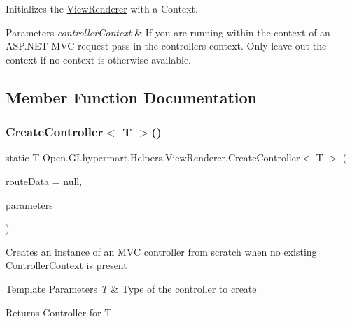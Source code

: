 Initializes the \hyperlink{class_open_1_1_g_i_1_1hypermart_1_1_helpers_1_1_view_renderer}{View\+Renderer} with a Context. 


\begin{DoxyParams}{Parameters}
{\em controller\+Context} & If you are running within the context of an A\+S\+P.\+N\+ET M\+VC request pass in the controller\textquotesingle{}s context. Only leave out the context if no context is otherwise available. \\
\hline
\end{DoxyParams}


\subsection{Member Function Documentation}
\hypertarget{class_open_1_1_g_i_1_1hypermart_1_1_helpers_1_1_view_renderer_a886a3c16dcc5798c5c820b87810e8c0f}{}\label{class_open_1_1_g_i_1_1hypermart_1_1_helpers_1_1_view_renderer_a886a3c16dcc5798c5c820b87810e8c0f} 
\subsubsection{\texorpdfstring{Create\+Controller$<$ T $>$()}{CreateController< T >()}}
{\footnotesize\ttfamily static T Open.\+G\+I.\+hypermart.\+Helpers.\+View\+Renderer.\+Create\+Controller$<$ T $>$ (\begin{DoxyParamCaption}\item[{Route\+Data}]{route\+Data = {\ttfamily null},  }\item[{params object \mbox{[}$\,$\mbox{]}}]{parameters }\end{DoxyParamCaption})\hspace{0.3cm}{\ttfamily [static]}}



Creates an instance of an M\+VC controller from scratch when no existing Controller\+Context is present 


\begin{DoxyTemplParams}{Template Parameters}
{\em T} & Type of the controller to create\\
\hline
\end{DoxyTemplParams}
\begin{DoxyReturn}{Returns}
Controller for T
\end{DoxyReturn}

